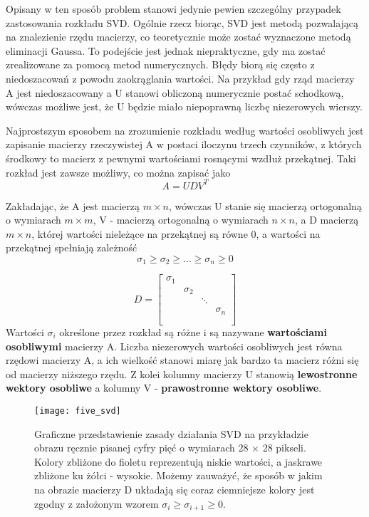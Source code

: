 \documentclass{article}
\begin{document}
Opisany w ten sposób problem stanowi jedynie pewien szczególny przypadek zastosowania rozkładu SVD. Ogólnie rzecz biorąc, SVD jest metodą pozwalającą na znalezienie rzędu macierzy, co teoretycznie może zostać wyznaczone metodą eliminacji Gaussa. To podejście jest jednak niepraktyczne, gdy ma zostać zrealizowane za pomocą metod numerycznych. Błędy biorą się często z niedoszacowań z powodu zaokrąglania wartości. Na przykład gdy rząd macierzy A jest niedoszacowany a U stanowi obliczoną numerycznie postać schodkową, wówczas możliwe jest, że U będzie miało niepoprawną liczbę niezerowych wierszy.

Najprostszym sposobem na zrozumienie rozkładu według wartości osobliwych jest zapisanie macierzy rzeczywistej A w postaci iloczynu trzech czynników, z których środkowy to macierz z pewnymi wartościami rosnącymi wzdłuż przekątnej. Taki rozkład jest zawsze możliwy, co można zapisać jako
\[A = UDV^T \]

Zakładając, że A jest macierzą $m \times n$, wówczas U stanie się macierzą ortogonalną o wymiarach $m \times m$, V - macierzą ortogonalną o wymiarach $n \times n$, a D macierzą $m \times n$, której wartości nieleżące na przekątnej są równe 0, a wartości na przekątnej spełniają zależność
\[\sigma_1 \geq \sigma_2 \geq \ldots \geq \sigma_n \geq 0\]

\[
D = \begin{bmatrix}
\sigma_1 & & & \\
& \sigma_2 & & \\
& & \ddots & \\
& & & \sigma_n \\\\
\end{bmatrix}
\]
Wartości $\sigma_i$ określone przez rozkład są różne i są nazywane \textbf{wartościami osobliwymi} macierzy A. Liczba niezerowych wartości osobliwych jest równa rzędowi macierzy A, a ich wielkość stanowi miarę jak bardzo ta macierz różni się od macierzy niższego rzędu. Z kolei kolumny macierzy U stanowią \textbf{lewostronne wektory osobliwe} a kolumny V - \textbf{prawostronne wektory osobliwe}.

\begin{figure}[h]
\centering
\texttt{[image: five\_svd]}
\caption{Graficzne przedstawienie zasady działania SVD na przykładzie obrazu ręcznie pisanej cyfry pięć o wymiarach 28 $\times$ 28 pikseli. Kolory zbliżone do fioletu reprezentują niskie wartości, a jaskrawe zbliżone ku żółci - wysokie. Możemy zauważyć, że sposób w jakim na obrazie macierzy D układają się coraz ciemniejsze kolory jest zgodny z założonym wzorem $\sigma_i \geq \sigma_{i+1} \geq 0$.}
\end{figure}
\end{document}
